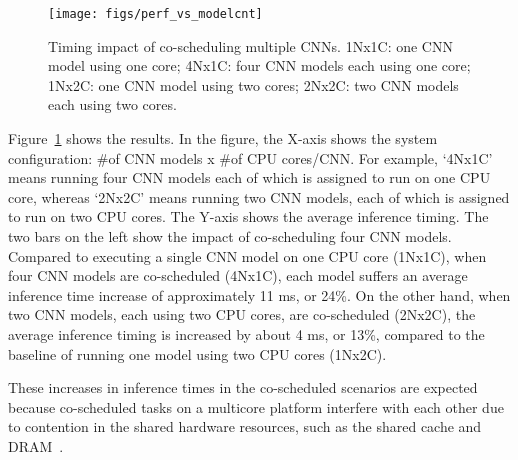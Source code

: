 \begin{figure}[h]
  \centering
  \texttt{[image: figs/perf\_vs\_modelcnt]}
  \caption{Timing impact of co-scheduling multiple CNNs. 1Nx1C: one CNN
    model using one core; 4Nx1C: four CNN models each using one core;
    1Nx2C: one CNN model using two cores; 2Nx2C: two CNN models each
    using two cores.}
  \label{fig:perf-vs-modelcnt}
\end{figure}

Figure~\ref{fig:perf-vs-modelcnt} shows the results. In the figure, the
X-axis shows the system configuration: \#of CNN models x \#of CPU
cores/CNN. For example, `4Nx1C' means running four CNN models each of
which is assigned to run on one CPU core, whereas `2Nx2C' means running
two CNN models, each of which is assigned to run on two CPU
cores. The Y-axis shows the average inference timing.
The two bars on the left show the impact of co-scheduling four CNN
models. Compared to executing a single CNN model on one CPU core
(1Nx1C), when four CNN models are co-scheduled (4Nx1C), each model
suffers an average inference time increase of approximately 11 ms,
or 24\%. On the other hand, when two CNN models, each using two CPU
cores, are co-scheduled (2Nx2C), the average inference timing is increased by
about 4 ms, or 13\%, compared to the baseline of running one model
using two CPU cores (1Nx2C).

These increases in inference times in the co-scheduled scenarios are
expected because co-scheduled tasks on a
multicore platform interfere with each other due to contention in the
shared hardware resources, such as the shared
cache and DRAM~\cite{Gracioli2015,Yun2013}.


